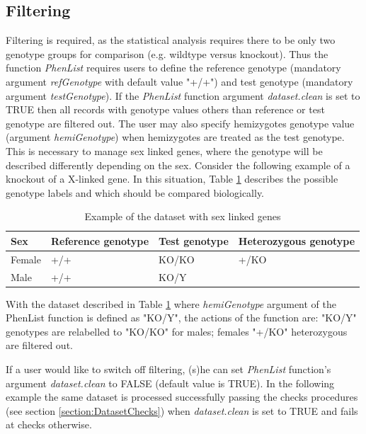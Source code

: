 \documentclass[12pt,a4paper]{article}
\begin{document}
\subsection{Filtering}
\label{section:Filtering}
Filtering is required, as the statistical analysis requires there to be only two genotype groups for comparison (e.g. wildtype versus knockout). Thus the function \textit{PhenList} requires users to define the reference genotype (mandatory argument \textit{refGenotype} with default value "+\slash+") and test genotype (mandatory argument \textit{testGenotype}). 
If the \textit{PhenList} function argument \textit{dataset.clean} is set to TRUE then all records with genotype values others than reference or test genotype are filtered out. 
The user may also specify hemizygotes genotype value (argument \textit{hemiGenotype}) when hemizygotes are treated as the test genotype. 
This is necessary to manage sex linked genes, where the genotype will be described differently depending on the sex. 
Consider the following example of a knockout of a X-linked gene. In this situation, Table \ref{table:03} describes the possible genotype labels and which should be compared biologically.
\begin{table}[!h]
\begin{center}
\begin{tabular}{| l | l | l | l |}
  \hline
Sex&Reference genotype&Test genotype&Heterozygous genotype\\\hline
Female&+\slash +&KO\slash KO&+\slash KO\\
Male&+\slash +&KO\slash Y& \\
\hline  
\end{tabular}
\caption{Example of the dataset with sex linked genes}\label{table:03}
\end{center}
\end{table}

With the dataset described in Table \ref{table:03} where \textit{hemiGenotype} argument of the PhenList function is defined as "KO\slash Y", the actions of the function are:  "KO/Y" genotypes are relabelled to "KO/KO" for males;  females "+\slash KO" heterozygous are filtered out. 

If a user would like to switch off filtering, (s)he can set \textit{PhenList} function's argument \textit{dataset.clean} to FALSE (default value is TRUE). 
In the following example the same dataset is processed successfully passing the checks procedures (see section \ref{section:DatasetChecks}) when \textit{dataset.clean} is set to TRUE and fails at checks otherwise.
\end{document}
